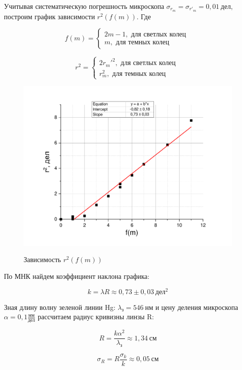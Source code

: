 \documentclass[a4paper,12pt]{article}
\begin{document}
Учитывая систематическую погрешность микроскопа $\sigma_{r_m} = \sigma_{r'_m}  = 0,01 \  дел$, построим график зависимости $r^2(f(m))$. Где

$$
f(m) = \begin{cases}
2m - 1, \text{ для светлых колец } \\
m, \text{ для темных колец }
\end{cases}
$$ 

$$
r^2 =  \begin{cases}
2r_m'^2, \text{ для светлых колец } \\
r_m^2, \text{ для темных колец }
\end{cases}
$$

\begin{figure}[h!]
	\begin{center}
	\includegraphics[scale=0.49]{graph1}
	\label{fig:setup}
	\caption{Зависимость $r^2(f(m))$}
	\end{center}
\end{figure}

\newpage

По МНК найдем коэффициент наклона графика:

$$
k = \lambda R \approx 0,73 \pm 0,03 \ дел^2
$$

Зная длину волну зеленой линии Hg: $ \lambda_{з} = 546 \ нм $ и цену деления микроскопа $\alpha = 0,1 \frac{мм}{дел}$ рассчитаем радиус кривизны линзы R:

$$
R = \frac{k \alpha^2}{\lambda_{з}} \approx 1,34 \ см
$$

$$
\sigma_{R} = R \frac{\sigma_{k}}{k} \approx 0,05 \ см 
$$
\end{document}
